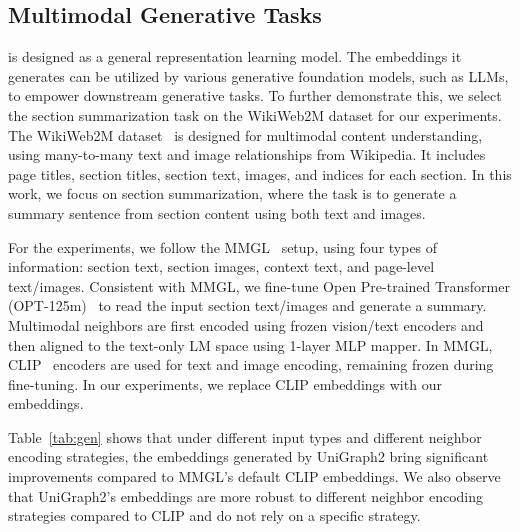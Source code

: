 \vspace{-5mm}
\subsection{Multimodal Generative Tasks}
\model is designed as a general representation learning model. The embeddings it generates can be utilized by various generative foundation models, such as LLMs, to empower downstream generative tasks. 
To further demonstrate this, we select the section summarization task on the WikiWeb2M dataset for our experiments.
The WikiWeb2M dataset~\cite{burns2023suite} is designed for multimodal content understanding, using many-to-many text and image relationships from Wikipedia. It includes page titles, section titles, section text, images, and indices for each section.
In this work, we focus on section summarization, where the task is to generate a summary sentence from section content using both text and images.

For the experiments, we follow the MMGL~\cite{yoon2023multimodal} setup, using four types of information: section text, section images, context text, and page-level text/images. 
Consistent with MMGL, we fine-tune Open Pre-trained Transformer (OPT-125m)~\cite{zhang2022opt} to read the input section text/images and generate a summary. Multimodal neighbors are first encoded using frozen vision/text encoders and then aligned to the text-only LM space using 1-layer MLP mapper.
In MMGL, CLIP~\cite{radford2021learning} encoders are used for text and image encoding, remaining frozen during fine-tuning. In our experiments, we replace CLIP embeddings with our \model embeddings.



Table~\ref{tab:gen} shows that under different input types and different neighbor encoding strategies, the embeddings generated by UniGraph2 bring significant improvements compared to MMGL's default CLIP embeddings. 
We also observe that UniGraph2's embeddings are more robust to different neighbor encoding strategies compared to CLIP and do not rely on a specific strategy.



